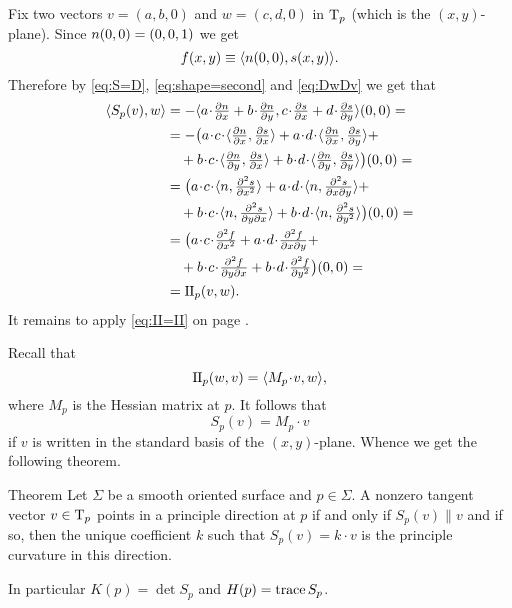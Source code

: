 Fix two vectors $v=(a,b,0)$ and $w=(c,d,0)$ in $\mathrm{T}_p$ (which is the $(x,y)$-plane).
Since $n(0,0)=(0,0,1)$ we get 
\[f(x,y)\equiv\langle n(0,0),s(x,y)\rangle.\]
Therefore by \ref{eq:S=D}, \ref{eq:shape=second} and \ref{eq:DwDv} we get that 
\begin{align*}
\langle S_p(v),w\rangle 
&=-\langle  a\cdot \tfrac{\partial \Norm}{\partial x}+b\cdot \tfrac{\partial \Norm}{\partial y},c\cdot \tfrac{\partial s}{\partial x}+d\cdot \tfrac{\partial s}{\partial y}\rangle(0,0)=
\\
&=-\bigl(a\cdot c\cdot\langle \tfrac{\partial \Norm}{\partial x},\tfrac{\partial s}{\partial x}\rangle 
+a\cdot d\cdot\langle \tfrac{\partial \Norm}{\partial x},\tfrac{\partial s}{\partial y}\rangle+
\\&\quad
+b\cdot c\cdot\langle \tfrac{\partial \Norm}{\partial y},\tfrac{\partial s}{\partial x}\rangle
+b\cdot d\cdot\langle \tfrac{\partial \Norm}{\partial y},\tfrac{\partial s}{\partial y}\rangle\bigr)(0,0)=
\\
&=\bigl(a\cdot c\cdot\langle \Norm,\tfrac{\partial^2 s}{\partial x^2}\rangle 
+a\cdot d\cdot\langle \Norm,\tfrac{\partial^2 s}{\partial x\partial y}\rangle+
\\&\quad
+b\cdot c\cdot\langle \Norm,\tfrac{\partial^2 s}{\partial y\partial x}\rangle
+b\cdot d\cdot\langle \Norm,\tfrac{\partial^2 s}{\partial y^2}\rangle\bigr)(0,0)=
\\
&=\bigl(a\cdot c\cdot\tfrac{\partial^2 f}{\partial x^2} 
+a\cdot d\cdot\tfrac{\partial^2 f}{\partial x\partial y}+
\\&\quad
+b\cdot c\cdot\tfrac{\partial^2 f}{\partial y\partial x}
+b\cdot d\cdot\tfrac{\partial^2 f}{\partial y^2}\bigr)(0,0)=
\\
&=\II_p(v,w).
\end{align*}
It remains to apply \ref{eq:II=II} on page \pageref{eq:II=II}.
\qeds

Recall that 
\[\II_p(w,v)=\langle M_p\cdot v,w\rangle,\]
where $M_p$ is the Hessian matrix at $p$.
It follows that 
\[S_p(v)=M_p\cdot v\]
if $v$ is written in the standard basis of the $(x,y)$-plane.
Whence we get the following theorem. 

\begin{thm}{Theorem}\label{thm:rodrigues}
Let $\Sigma$ be a smooth oriented surface and $p\in \Sigma$.
A nonzero tangent vector $v\in \mathrm{T}_p$ points in a principle direction at $p$
if and only if $S_p(v)\parallel v$ and if so, then the unique coefficient $k$ such that
$S_p(v)=k\cdot v$ is the principle curvature in this direction.

In particular $K(p)=\det S_p$ and $H(p)=\mathop{\rm trace}\nolimits S_p $.
\end{thm}


